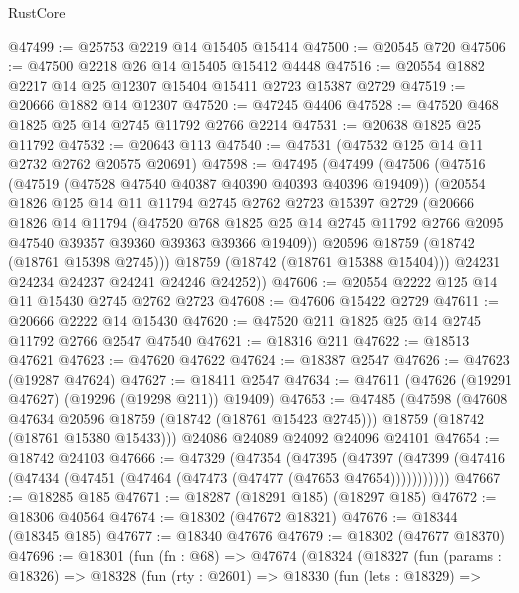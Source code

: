 \begin{lexlean}{RustCore}
\begin{coremodule}
@47499 := @25753 @2219 @14 @15405 @15414
@47500 := @20545 @720
@47506 := @47500 @2218 @26 @14 @15405 @15412 @4448
@47516 := @20554 @1882 @2217 @14 @25 @12307 @15404 @15411 @2723 @15387 @2729
@47519 := @20666 @1882 @14 @12307
@47520 := @47245 @4406
@47528 := @47520 @468 @1825 @25 @14 @2745 @11792 @2766 @2214
@47531 := @20638 @1825 @25 @11792
@47532 := @20643 @113
@47540 := @47531 (@47532 @125 @14 @11 @2732 @2762 @20575 @20691)
@47598 := @47495
    (@47499
      (@47506
        (@47516
          (@47519 (@47528 @47540 @40387 @40390 @40393 @40396 @19409))
          (@20554
            @1826
            @125
            @14
            @11
            @11794
            @2745
            @2762
            @2723
            @15397
            @2729
            (@20666
              @1826
              @14
              @11794
              (@47520
                @768
                @1825
                @25
                @14
                @2745
                @11792
                @2766
                @2095
                @47540
                @39357
                @39360
                @39363
                @39366
                @19409))
            @20596
            @18759
            (@18742 (@18761 @15398 @2745)))
          @18759
          (@18742 (@18761 @15388 @15404)))
        @24231
        @24234
        @24237
        @24241
        @24246
        @24252))
@47606 := @20554 @2222 @125 @14 @11 @15430 @2745 @2762 @2723
@47608 := @47606 @15422 @2729
@47611 := @20666 @2222 @14 @15430
@47620 := @47520 @211 @1825 @25 @14 @2745 @11792 @2766 @2547 @47540
@47621 := @18316 @211
@47622 := @18513 @47621
@47623 := @47620 @47622
@47624 := @18387 @2547
@47626 := @47623 (@19287 @47624)
@47627 := @18411 @2547
@47634 := @47611 (@47626 (@19291 @47627) (@19296 (@19298 @211)) @19409)
@47653 := @47485
    (@47598
      (@47608 @47634 @20596 @18759 (@18742 (@18761 @15423 @2745)))
      @18759
      (@18742 (@18761 @15380 @15433)))
    @24086
    @24089
    @24092
    @24096
    @24101
@47654 := @18742 @24103
@47666 := @47329
    (@47354
      (@47395
        (@47397 (@47399 (@47416 (@47434 (@47451 (@47464 (@47473 (@47477 (@47653 @47654)))))))))))
@47667 := @18285 @185
@47671 := @18287 (@18291 @185) (@18297 @185)
@47672 := @18306 @40564
@47674 := @18302 (@47672 @18321)
@47676 := @18344 (@18345 @185)
@47677 := @18340 @47676
@47679 := @18302 (@47677 @18370)
@47696 := @18301
    (fun (fn : @68) =>
    @47674
      (@18324
        (@18327
          (fun (params : @18326) =>
          @18328
            (fun (rty : @2601) =>
            @18330
              (fun (lets : @18329) =>

\end{coremodule}
\end{lexlean}
